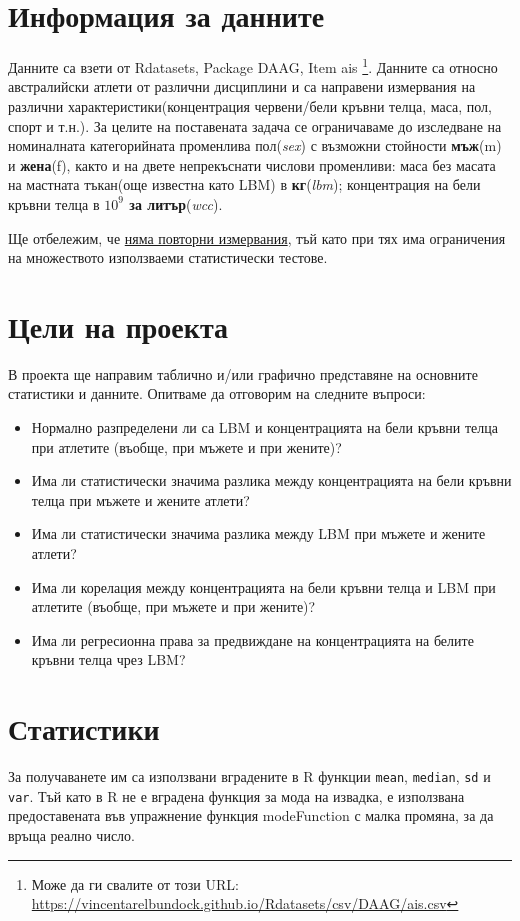 \documentclass[12pt]{article}
\newcommand{\code}{\texttt}
\begin{document}
\begin{large}
\tableofcontents{}


\section{Информация за данните}
Данните са взети от Rdatasets, Package DAAG, Item ais \footnote{Може да ги свалите от този URL: \url{https://vincentarelbundock.github.io/Rdatasets/csv/DAAG/ais.csv}}. Данните са относно австралийски атлети от различни дисциплини и са направени измервания на различни характеристики(концентрация червени/бели кръвни телца, маса, пол, спорт и т.н.). За целите на поставената задача се ограничаваме до изследване на номиналната категорийната променлива пол(\textit{sex}) с възможни стойности \textbf{мъж}(m) и \textbf{жена}(f), както и на двете непрекъснати числови променливи: маса без масата на мастната тъкан(още известна като LBM) в \textbf{кг}(\textit{lbm}); концентрация на бели кръвни телца в \textbf{$10^9$ за литър}(\textit{wcc}). \par
Ще отбележим, че \uline{няма повторни измервания}, тъй като при тях има ограничения на множеството използваеми статистически тестове.

\section{Цели на проекта}

В проекта ще направим таблично и/или графично представяне на основните статистики и данните. Опитваме да отговорим на следните въпроси:

\begin{itemize}
\item Нормално разпределени ли са LBM и концентрацията на бели кръвни телца при атлетите (въобще, при мъжете и при жените)?
\item Има ли статистически значима разлика между концентрацията на бели кръвни телца при мъжете и жените атлети?
\item Има ли статистически значима разлика между LBM при мъжете и жените атлети?
\item Има ли корелация между концентрацията на бели кръвни телца и LBM при атлетите (въобще, при мъжете и при жените)?
\item Има ли регресионна права за предвиждане на концентрацията на белите кръвни телца чрез LBM?
\end{itemize}

\section{Статистики}
За получаванете им са използвани вградените в R функции \code{mean}, \code{median}, \code{sd} и \code{var}. Тъй като в R не е вградена функция за мода на извадка, е използвана предоставената във упражнение функция modeFunction с малка промяна, за да връща реално число.


\end{large}
\end{document}
